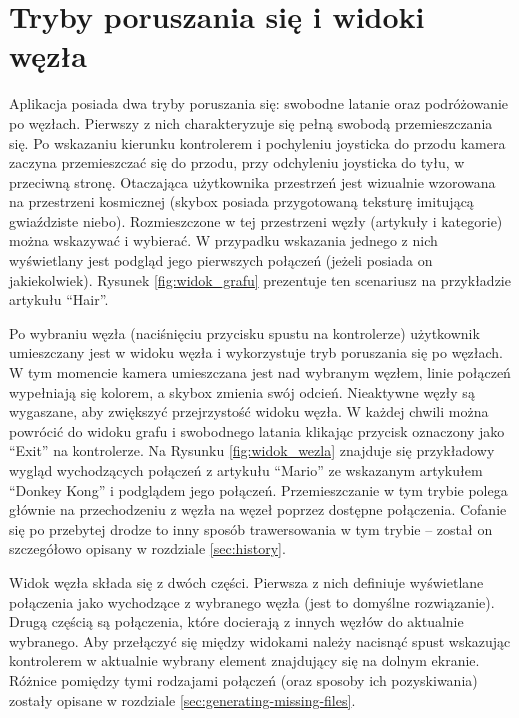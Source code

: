 \section{Tryby poruszania się i widoki węzła}
\label{sec:tryby-widoki}
Aplikacja posiada dwa tryby poruszania się: swobodne latanie oraz podróżowanie po węzłach. Pierwszy z nich charakteryzuje się pełną swobodą przemieszczania się. Po wskazaniu kierunku kontrolerem i pochyleniu joysticka do przodu kamera zaczyna przemieszczać się do przodu, przy odchyleniu joysticka do tyłu, w przeciwną stronę. Otaczająca użytkownika przestrzeń jest wizualnie wzorowana na przestrzeni kosmicznej (skybox posiada przygotowaną teksturę imitującą gwiaździste niebo). Rozmieszczone w tej przestrzeni węzły (artykuły i kategorie) można wskazywać i wybierać. W przypadku wskazania jednego z nich wyświetlany jest podgląd jego pierwszych połączeń (jeżeli posiada on jakiekolwiek). Rysunek \ref{fig:widok_grafu} prezentuje ten scenariusz na przykładzie artykułu ``Hair''.


Po wybraniu węzła (naciśnięciu przycisku spustu na kontrolerze) użytkownik umieszczany jest w widoku węzła i wykorzystuje tryb poruszania się po węzłach. W tym momencie kamera umieszczana jest nad wybranym węzłem, linie połączeń wypełniają się kolorem, a skybox zmienia swój odcień. Nieaktywne węzły są wygaszane, aby zwiększyć przejrzystość widoku węzła. W każdej chwili można powrócić do widoku grafu i swobodnego latania klikając przycisk oznaczony jako ``Exit'' na kontrolerze. Na Rysunku \ref{fig:widok_wezla} znajduje się przykładowy wygląd wychodzących połączeń z artykułu ``Mario'' ze wskazanym artykułem ``Donkey Kong'' i podglądem jego połączeń. Przemieszczanie w tym trybie polega głównie na przechodzeniu z węzła na węzeł poprzez dostępne połączenia. Cofanie się po przebytej drodze to inny sposób trawersowania w tym trybie – został on szczegółowo opisany w rozdziale \ref{sec:history}.


Widok węzła składa się z dwóch części. Pierwsza z nich definiuje wyświetlane połączenia jako wychodzące z wybranego węzła (jest to domyślne rozwiązanie). Drugą częścią są połączenia, które docierają z innych węzłów do aktualnie wybranego. Aby przełączyć się między widokami należy nacisnąć spust wskazując kontrolerem w aktualnie wybrany element znajdujący się na dolnym ekranie. Różnice pomiędzy tymi rodzajami połączeń (oraz sposoby ich pozyskiwania) zostały opisane w rozdziale \ref{sec:generating-missing-files}.